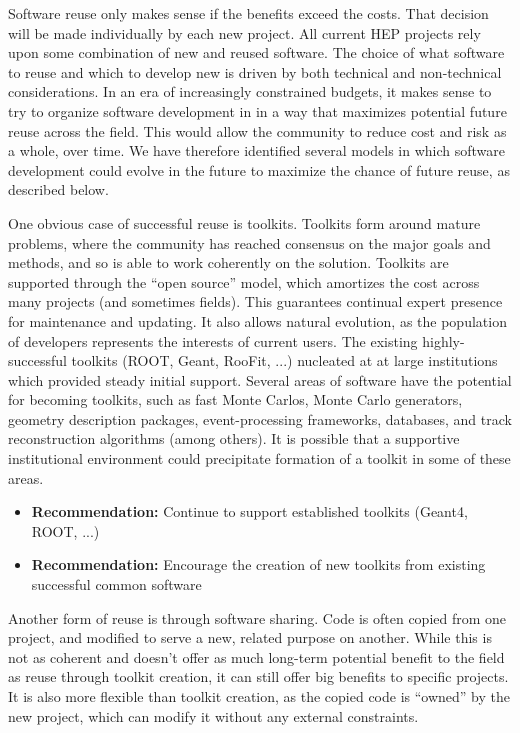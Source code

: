 Software reuse only makes sense if the benefits exceed the costs.
That decision will be made individually by each new project.
All current HEP projects rely upon some combination of new and reused
software. The choice of what software to reuse and which to develop
new is driven by both technical and non-technical considerations.
In an era of increasingly constrained budgets,
it makes sense to try to organize software development
in \HEP in a way that maximizes potential future
reuse across the field.  This would allow the community
to reduce cost and risk as a whole, over time.
We have therefore identified several models in which
\HEP software development could evolve in the future to maximize the chance
of future reuse, as described below.

One obvious case of successful reuse is toolkits.  Toolkits form around mature problems,
where the community has reached consensus on the major goals and methods,
and so is able to work coherently on the solution.
Toolkits are supported through the ``open source'' model, which amortizes
the cost across many projects (and sometimes fields).
This guarantees continual expert presence for maintenance and updating.
It also allows natural evolution, as the population
of developers represents the interests of current users.
The existing highly-successful toolkits (ROOT, Geant, RooFit, ...) nucleated at
at large institutions which provided steady initial support.
Several areas of \HEP software have the potential
for becoming toolkits, such as fast Monte Carlos, Monte Carlo generators, 
geometry description packages,
event-processing frameworks, databases, and track reconstruction algorithms (among others).
It is possible that a supportive institutional environment
could precipitate formation of a toolkit in some of these areas. 

\begin{itemize}
\item[] {\bf Recommendation:} 
Continue to support established toolkits (Geant4, ROOT, ...)
\item[] {\bf Recommendation:} 
Encourage the creation of new toolkits from existing successful common software
\end{itemize}

Another form of reuse is through software sharing.  Code is often copied from one project,
and modified to serve a new, related purpose on another.  While
this is not as coherent and doesn't offer as much long-term
potential benefit to the field as reuse through toolkit creation,
it can still offer big benefits to specific projects.
It is also more flexible than toolkit creation, as the copied code
is ``owned'' by the new project, which can modify it without any external constraints.

